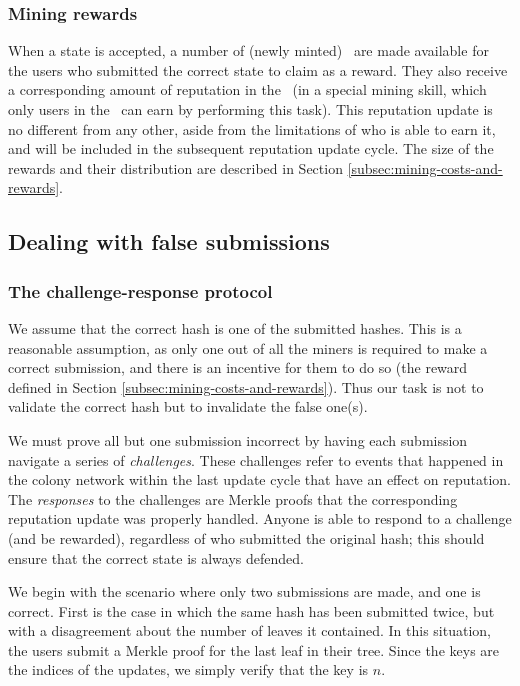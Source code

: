 \subsubsection*{Mining rewards}

When a state is accepted, a number of (newly minted) \rcts\ are made available for the users who submitted the correct state to claim as a reward. They also receive a corresponding amount of reputation in the \rc\ (in a special mining skill, which only users in the \rc\ can earn by performing this task). This reputation update is no different from any other, aside from the limitations of who is able to earn it, and will be included in the subsequent reputation update cycle. The size of the rewards and their distribution are described in Section \ref{subsec:mining-costs-and-rewards}.

\subsection{Dealing with false submissions}\label{sec:challengeresponse}
%
\subsubsection{The challenge-response protocol}

We assume that the correct hash is one of the  submitted hashes. This is a reasonable assumption, as only one out of all the miners is required to make a correct submission, and there is an incentive for them to do so (the reward defined in Section \ref{subsec:mining-costs-and-rewards}). Thus our task is not to validate the correct hash but to invalidate the false one(s).

We must prove all but one submission incorrect by having each submission navigate a series of \emph{challenges}. These challenges refer to events that happened in the colony network within the last update cycle that have an effect on reputation. The \emph{responses} to the challenges are Merkle proofs that the corresponding reputation update was properly handled. Anyone is able to respond to a challenge (and be rewarded), regardless of who submitted the original hash; this should ensure that the correct state is always defended.

We begin with the scenario where only two submissions are made, and one is correct. First is the case in which the same hash has been submitted twice, but with a disagreement about the number of leaves it contained. In this situation, the users submit a Merkle proof for the last leaf in their tree. Since the keys are the indices of the updates, we simply verify that the key is $n$.

